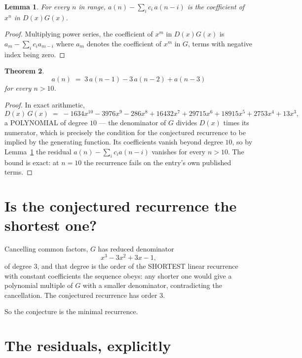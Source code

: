 \documentclass[11pt,a4paper]{article}
\theoremstyle{plain}
\newtheorem{theorem}{Theorem}
\newtheorem{lemma}[theorem]{Lemma}
\theoremstyle{definition}
\begin{document}
\begin{lemma}\label{lem:key}
For every $n$ in range, $a(n)-\sum_i c_i\,a(n-i)$ is the coefficient of $x^{n}$ in
$D(x)G(x)$.
\end{lemma}

\begin{proof}
Multiplying power series, the coefficient of $x^{m}$ in $D(x)G(x)$ is
$a_m-\sum_i c_i a_{m-i}$ where $a_m$ denotes the coefficient of $x^{m}$ in $G$, terms with
negative index being zero.
\end{proof}

\begin{theorem}
\[
a(n)\;=\;3\,a(n-1) - 3\,a(n-2) + a(n-3)
\]
for every $n>10$.
\end{theorem}

\begin{proof}
In exact arithmetic,
\[
D(x)\,G(x)\;=\;- 1634 x^{10} - 3976 x^{9} - 286 x^{8} + 16432 x^{7} + 29715 x^{6} + 18915 x^{5} + 2753 x^{4} + 13 x^{3},
\]
a POLYNOMIAL of degree $10$ --- the denominator of $G$ divides $D(x)$ times its numerator,
which is precisely the condition for the conjectured recurrence to be implied by the
generating function. Its coefficients vanish beyond degree $10$, so by
Lemma~\ref{lem:key} the residual $a(n)-\sum_ic_ia(n-i)$ vanishes for every
$n>10$. The bound is exact: at $n=10$ the recurrence fails on the entry's own published terms.
\end{proof}

\section{Is the conjectured recurrence the shortest one?}

Cancelling common factors, $G$ has reduced denominator
\[
x^{3} - 3 x^{2} + 3 x - 1,
\]
of degree $3$, and that degree is the order of the SHORTEST linear recurrence with
constant coefficients the sequence obeys: any shorter one would give a polynomial multiple of
$G$ with a smaller denominator, contradicting the cancellation. The conjectured recurrence has
order $3$.

So the conjecture is the minimal recurrence.

\section{The residuals, explicitly}
\end{document}
